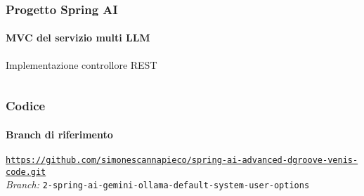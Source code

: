 %
\begin{frame}[t,fragile] \frametitle{Progetto Spring AI}
    \framesubtitle{MVC del servizio multi LLM}
    	\vspace*{-.7cm}
        \begin{block}{Implementazione controllore REST}
			{\tiny\inputminted{java}{code/QuestionController.java}}
    	\end{block}
\end{frame}
%
\begin{frame}[fragile] \frametitle{Codice}
    \framesubtitle{Branch di riferimento}
	\begin{center}
		{\scriptsize \href{https://github.com/simonescannapieco/spring-ai-advanced-dgroove-venis-code.git}{\texttt{https://github.com/simonescannapieco/spring-ai-advanced-dgroove-venis-code.git}}}\\
		\textit{Branch:} \alert{\texttt{2-spring-ai-gemini-ollama-default-system-user-options}}
	\end{center}
\end{frame}